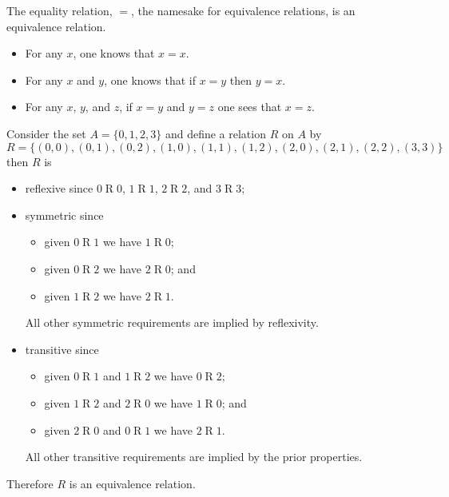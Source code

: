 \begin{example}
    The equality relation, $=$, the namesake for equivalence relations, is an equivalence relation.
    \begin{itemize}
        \item For any $x$, one knows that $x = x$.
        \item For any $x$ and $y$, one knows that if $x = y$ then $y = x$.
        \item For any $x$, $y$, and $z$, if $x = y$ and $y = z$ one sees that $x = z$.
    \end{itemize}
\end{example}

\begin{example}
    Consider the set $A = \{0, 1, 2, 3\}$ and define a relation $R$ on $A$ by
    \[
        R = \{(0, 0), (0, 1), (0, 2), (1, 0), (1, 1), (1, 2), (2, 0), (2, 1), (2, 2), (3, 3)\}
    \]
    then $R$ is
    \begin{itemize}
        \item reflexive since $0\mathrel{R}0$, $1\mathrel{R}1$, $2\mathrel{R}2$, and $3\mathrel{R}3$;
        \item symmetric since
        \begin{itemize}
            \item given $0\mathrel{R}1$ we have $1\mathrel{R}0$;
            \item given $0\mathrel{R}2$ we have $2\mathrel{R}0$; and
            \item given $1\mathrel{R}2$ we have $2\mathrel{R}1$.
        \end{itemize}
        All other symmetric requirements are implied by reflexivity.
        \item transitive since
        \begin{itemize}
            \item given $0\mathrel{R}1$ and $1\mathrel{R}2$ we have $0\mathrel{R}2$;
            \item given $1\mathrel{R}2$ and $2\mathrel{R}0$ we have $1\mathrel{R}0$; and
            \item given $2\mathrel{R}0$ and $0\mathrel{R}1$ we have $2\mathrel{R}1$.
        \end{itemize}
        All other transitive requirements are implied by the prior properties.
    \end{itemize}
    Therefore $R$ is an equivalence relation.
\end{example}

